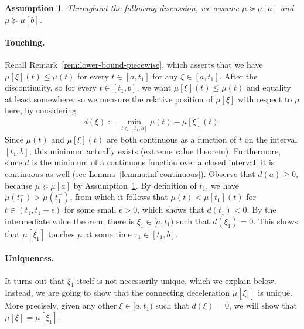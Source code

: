 \documentclass[a4paper]{report}
\theoremstyle{definition}
\theoremstyle{plain}
\newtheorem{assump}{Assumption}[chapter]
\newcommand\halfopen[2]{\ensuremath{[#1,#2)}}
\begin{document}
\begin{assump}\label{assump:smoothing}
  Throughout the following discussion, we assume $\mu \succeq \mu[a]$ and $\mu \succeq \mu[b]$.
\end{assump}



\paragraph{Touching.}
Recall Remark~\ref{rem:lower-bound-piecewise}, which asserts that we have
$\mu[\xi](t) \leq \mu(t)$ for every $t \in [a,t_{1}]$ for any $\xi \in [a, t_{1}]$.
%
After the discontinuity, so for every $t \in [t_{1}, b]$, we want
$\mu[\xi](t) \leq \mu(t)$ and equality at least somewhere, so we measure the relative
position of $\mu[\xi]$ with respect to $\mu$ here, by considering
\begin{align}
  d(\xi) := \min_{t \in [t_{1}, b]} \mu(t) - \mu[\xi](t) .
\end{align}
Since $\mu(t)$ and $\mu[\xi](t)$ are both continuous as a function of $t$ on the interval
$[t_{1}, b]$, this minimum actually exists (extreme value theorem).
%
Furthermore, since $d$ is the minimum of a continuous function over a closed
interval, it is continuous as well (see Lemma~\ref{lemma:inf-continuous}).
%
Observe that $d(a) \geq 0$, because $\mu \succeq \mu[a]$ by Assumption~\ref{assump:smoothing}.
%
By definition of $t_{1}$, we have $\dot{\mu}(t_{1}^{-}) > \dot{\mu}(t_{1}^{+})$,
from which it follows that $\mu(t) < \mu[t_{1}](t)$ for $ t\in (t_{1}, t_{1} + \epsilon)$ for some
small $\epsilon > 0$, which shows that $d(t_{1}) < 0$.
%
By the intermediate value theorem, there is $\xi_{1} \in \halfopen{a}{t_{1}}$ such
that $d(\xi_{1}) = 0$.
%
This shows that $\mu[\xi_{1}]$ touches $\mu$ at some time
$\tau_{1} \in [t_{1}, b]$.


\paragraph{Uniqueness.}
It turns out that $\xi_{1}$ itself is not necessarily unique, which we explain
below. Instead, we are going to show that the connecting deceleration
$\mu[\xi_{1}]$ is unique. More precisely, given any other $\xi \in \halfopen{a}{t_{1}}$ such
that $d(\xi) = 0$, we will show that $\mu[\xi] = \mu[\xi_{1}]$.
\end{document}
